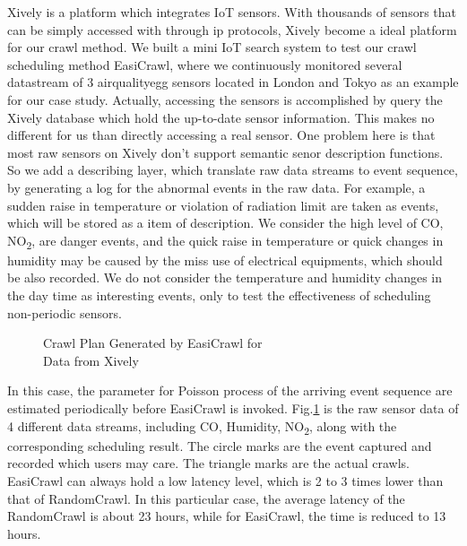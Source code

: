 \documentclass[conference]{IEEEtran}
\begin{document}
Xively is a platform which integrates IoT sensors. 
With thousands of sensors that can be simply accessed with through ip protocols, Xively become a ideal platform for our crawl method.
We built a mini IoT search system to test our crawl scheduling method EasiCrawl, where we continuously monitored several datastream of 3 airqualityegg\cite{airegg} sensors located in London and Tokyo as an example for our case study. 
Actually, accessing the sensors is accomplished by query the Xively database which hold the up-to-date sensor information. 
This makes no different for us than directly accessing a real sensor. 
One problem here is that most raw sensors on Xively don't support semantic senor description functions. 
So we add a describing layer, which translate raw data streams to event sequence, by generating a log for the abnormal events in the raw data. 
For example, a sudden raise in temperature or violation of radiation limit are taken as events, which will be stored as a item of description.
We consider the high level of CO, NO\textsubscript{2}, are danger events, and the quick raise in temperature or quick changes in humidity may be caused by the miss use of electrical equipments, which should be also recorded. 
We do not consider the temperature and humidity changes in the day time as interesting events, only to test the effectiveness of scheduling non-periodic sensors.

\begin{figure}
	\centering
	\hspace{-1.0em}
	
	\captionsetup{justification=centering}
	\caption{Crawl Plan Generated by EasiCrawl for \\
		Data from Xively}
	\vspace{-1.5em}
	\label{fig:xivelycasestudy}
\end{figure}

In this case, the parameter for Poisson process of the arriving event sequence are estimated periodically before EasiCrawl is invoked.
Fig.\ref{fig:xivelycasestudy} is the raw sensor data of 4 different data streams, including CO, Humidity, NO\textsubscript{2}, along with the corresponding scheduling result. 
The circle marks are the event captured and recorded which users may care. 
The triangle marks are the actual crawls. 
EasiCrawl can always hold a low latency level, which is 2 to 3 times lower than that of RandomCrawl.
In this particular case, the average latency of the RandomCrawl is about 23 hours, while for EasiCrawl, the time is reduced to 13 hours. 
\end{document}
